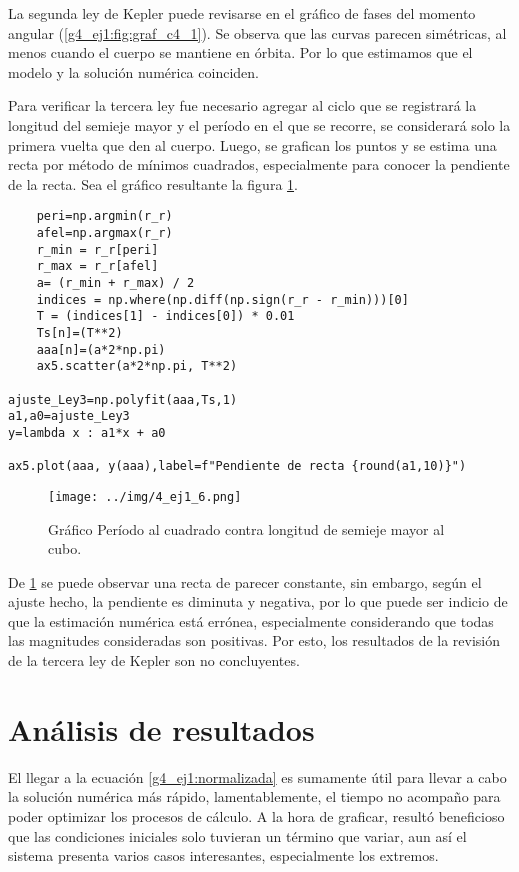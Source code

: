 \documentclass[../portafolio.tex]{subfiles}
\begin{document}
La segunda ley de Kepler puede revisarse en el gráfico de fases del momento angular (\ref{g4_ej1:fig:graf_c4_1}). Se observa que las curvas parecen simétricas, al menos cuando el cuerpo se mantiene en órbita. Por lo que estimamos que el modelo y la solución numérica coinciden.  

Para verificar la tercera ley fue necesario agregar al ciclo que se registrará la longitud del semieje mayor y el período en el que se recorre, se considerará solo la primera vuelta que den al cuerpo. Luego, se grafican los puntos y se estima una recta por método de mínimos cuadrados, especialmente para conocer la pendiente de la recta. Sea el gráfico resultante la figura \ref{g4_ej1:fig:graf_c4_6}.

\begin{verbatim}
	peri=np.argmin(r_r)
    afel=np.argmax(r_r)
    r_min = r_r[peri]
    r_max = r_r[afel]
    a= (r_min + r_max) / 2 
    indices = np.where(np.diff(np.sign(r_r - r_min)))[0]
    T = (indices[1] - indices[0]) * 0.01 
    Ts[n]=(T**2) 
    aaa[n]=(a*2*np.pi)  
    ax5.scatter(a*2*np.pi, T**2)

ajuste_Ley3=np.polyfit(aaa,Ts,1)
a1,a0=ajuste_Ley3
y=lambda x : a1*x + a0

ax5.plot(aaa, y(aaa),label=f"Pendiente de recta {round(a1,10)}")
\end{verbatim}

\begin{figure}
\centering
\texttt{[image: ../img/4\_ej1\_6.png]}
\caption{Gráfico Período al cuadrado contra longitud de semieje mayor al cubo.} \label{g4_ej1:fig:graf_c4_6}
\end{figure}

De \ref{g4_ej1:fig:graf_c4_6} se puede observar una recta de parecer constante, sin embargo, según el ajuste hecho, la pendiente es diminuta y negativa, por lo que puede ser indicio de que la estimación numérica está errónea, especialmente considerando que todas las magnitudes consideradas son positivas. Por esto, los resultados de la revisión de la tercera ley de Kepler son no concluyentes.

\section{Análisis de resultados}
El llegar a la ecuación \eqref{g4_ej1:normalizada} es sumamente útil para llevar a cabo la solución numérica más rápido, lamentablemente, el tiempo no acompaño para poder optimizar los procesos de cálculo. A la hora de graficar, resultó beneficioso que las condiciones iniciales solo tuvieran un término que variar, aun así el sistema presenta varios casos interesantes, especialmente los extremos.
\end{document}
